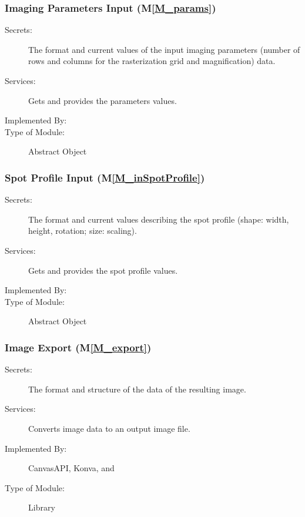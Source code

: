 \documentclass[12pt, titlepage]{article}
\newcommand{\mref}[1]{M\ref{#1}}
\begin{document}
\subsubsection{Imaging Parameters Input (\mref{M_params})}
\begin{description}
\item[Secrets:] The format and current values of the input imaging parameters (number
  of rows and columns for the rasterization grid and magnification) data.
\item[Services:] Gets and provides the parameters values.
\item[Implemented By:] \progname{}
\item[Type of Module:] Abstract Object
\end{description}


\subsubsection{Spot Profile Input (\mref{M_inSpotProfile})}
\begin{description}
\item[Secrets:] The format and current values describing the spot profile
  (shape: width, height, rotation; size: scaling).
\item[Services:] Gets and provides the spot profile values.
\item[Implemented By:] \progname{}
\item[Type of Module:] Abstract Object
\end{description}


\subsubsection{Image Export (\mref{M_export})}
\begin{description}
\item[Secrets:] The format and structure of the data of the resulting image.
\item[Services:] Converts image data to an output image file.
\item[Implemented By:] CanvasAPI, Konva, and \progname{}
\item[Type of Module:] Library
\end{description}
\end{document}
